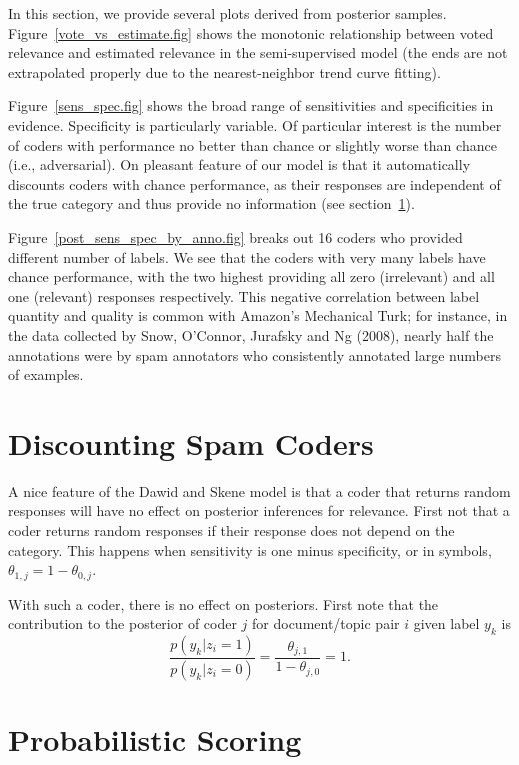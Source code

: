 \documentclass{article}
\begin{document}
%
In this section, we provide several plots derived from posterior 
samples.  Figure~\ref{vote_vs_estimate.fig} shows the monotonic relationship
between voted relevance and estimated relevance in the semi-supervised
model (the ends are not extrapolated properly due to the
nearest-neighbor trend curve fitting).  

Figure~\ref{sens_spec.fig}
shows the broad range of sensitivities and specificities in evidence.
Specificity is particularly variable.  Of particular interest is the
number of coders with performance no better than chance or slightly
worse than chance (i.e., adversarial).  On pleasant feature of our
model is that it automatically discounts coders with chance
performance, as their responses are independent of the true category
and thus provide no information (see section~\ref{spam-coder-sec}).

Figure~\ref{post_sens_spec_by_anno.fig} breaks out 16 coders who
provided different number of labels.  We see that the coders with very
many labels have chance performance, with the two highest providing
all zero (irrelevant) and all one (relevant) responses respectively.  This negative correlation
between label quantity and quality is common with Amazon's Mechanical
Turk; for instance, in the data collected by Snow, O'Connor, Jurafsky
and Ng (2008), nearly half the annotations were by spam annotators
who consistently annotated large numbers of examples.


\section{Discounting Spam Coders}\label{spam-coder-sec}

A nice feature of the Dawid and Skene model is that a coder that
returns random responses will have no effect on posterior inferences
for relevance.  First not that a coder returns random responses if
their response does not depend on the category.  This happens when
sensitivity is one minus specificity, or in symbols, $\theta_{1,j} = 1
- \theta_{0,j}$.  

With such a coder, there is no effect on posteriors.  First note that
the contribution to the posterior of coder $j$ for document/topic pair
$i$ given label $y_k$ is 
%
\[
\frac{p(y_k|z_i =1)}{p(y_k|z_i = 0)}
= \frac{\theta_{j,1}}{1 - \theta_{j,0}} = 1.
\]


\section{Probabilistic Scoring}
\end{document}
